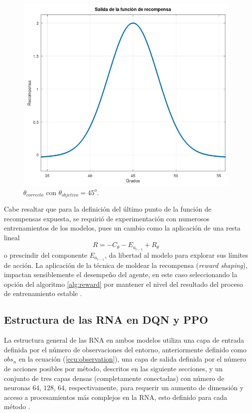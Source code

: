 \begin{figure}[hh]
	\centering
	\includegraphics[scale=0.4]{fig/new/Rewardfunccampana.png}
	\caption{$\theta_{correcto}$ con $\theta_{objetivo}=45^o$.}
	\label{fig:rewfunccampana}
\end{figure}
 
Cabe resaltar que para la definición del último punto de la función de recompensas expuesta, se requirió de experimentación con numerosos entrenamientos de los modelos, pues un cambio como la aplicación de una resta lineal
\begin{equation}
R = -C_{\theta} -E_{a_{t-1}} + R_{\theta}
\end{equation}
o prescindir del componente $E_{a_{t-1}}$, da libertad al modelo para explorar sus límites de acción. La aplicación de la técnica de moldear la recompensa (\textit{reward shaping}), impactan sensiblemente el desempeño del agente, en este caso seleccionando la opción del algoritmo \ref{alg:reward} por mantener el nivel del resultado del proceso de entrenamiento estable \cite{RewardShaping}.
 
\subsection{Estructura de las RNA en DQN y PPO}

La estructura general de las RNA en ambos modelos utiliza una capa de entrada definida por el número de observaciones del entorno, anteriormente definido como $obs_n$ en la ecuación (\ref{ecu:observation}), una capa de salida definida por el número de acciones posibles por método, descritos en las siguiente secciones, y un conjunto de tres capas densas (completamente conectadas) con número de neuronas $64$, $128$, $64$, respectivamente, para requerir un aumento de dimensión y acceso a procesamientos más complejos en la RNA, esto definido para cada método \cite{DataScience}.

